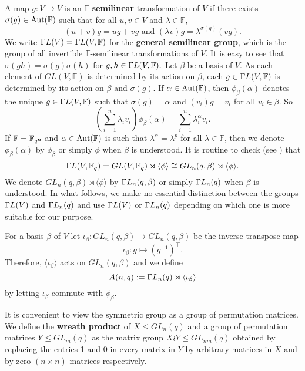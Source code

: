 A map $g: V \to V$ is an $\mathbb{F}$-{\bf semilinear}  transformation of $V$ if there exists $\sigma(g) \in \mathrm{Aut}(\mathbb{F})$ such that for all $u,v \in V$ and $\lambda \in \mathbb{F}$,
$$(u+v)g=ug +vg \text{ and } (\lambda v)g=\lambda^{\sigma(g)}(vg).$$
We write ${{\Gamma L}}(V)={{\Gamma L}}(V, \mathbb{F})$ for the {\bf general semilinear group}, which is the group of all invertible $\mathbb{F}$-semilinear transformations of $V$. It is easy to see that $\sigma(gh)=\sigma(g)\sigma(h)$ for $g,h \in {{\Gamma L}}(V, \mathbb{F}).$ Let $\beta$ be a basis of $V$. As each element of $GL(V, \mathbb{F})$ is determined by its action on $\beta$,  each  $g \in {{\Gamma L}}(V, \mathbb{F})$ is determined by its action on $\beta$ and $\sigma(g).$ If $\alpha \in \mathrm{Aut}(\mathbb{F})$, then $\phi_{\beta}(\alpha)$ denotes the unique  $g \in {{\Gamma L}}(V, \mathbb{F})$ such that $\sigma(g)=\alpha$ and $(v_i)g=v_i$ for all $v_i \in \beta.$ So
\begin{equation}
\label{defphibet}
\left(\sum_{i=1}^n \lambda_i v_i \right) \phi_{\beta}(\alpha)= \sum_{i=1}^n\lambda_i^{\alpha} v_i.
\end{equation}
 If $\mathbb{F}= \mathbb{F}_{q^{\bf u}}$ and $\alpha \in \mathrm{Aut}(\mathbb{F})$ is such that $\lambda^{\alpha}=\lambda^p$ for all $\lambda \in \mathbb{F}$,  then we denote $\phi_{\beta}(\alpha)$ by $\phi_{\beta}$ \index{$\phi_{\beta}$} or simply $\phi$ when $\beta$ is understood. It is routine to check (see \cite[\S 2.2]{kleidlieb}) that  $${{\Gamma L}}(V, \mathbb{F}_q)= GL(V, \mathbb{F}_q) \rtimes \langle \phi \rangle \cong GL_n(q, \beta) \rtimes \langle \phi \rangle.$$ We denote $GL_n(q, \beta) \rtimes \langle \phi \rangle$ by ${{\Gamma L}}_n(q, \beta)$ or simply ${{\Gamma L}}_n(q)$ when $\beta$ is understood. In what follows,
we make no essential distinction between the groups ${{\Gamma L}}(V )$ and ${{\Gamma L}}_n(q)$ and use ${{\Gamma L}}(V )$ or
${{\Gamma L}}_n (q)$ depending on which one is more suitable for our purpose.

For a basis $\beta$ of $V$ let $\iota_{\beta}: GL_n(q, \beta) \to GL_n(q, \beta)$ be the inverse-transpose map 
$$\iota_{\beta}: g \mapsto (g^{-1})^{\top}.$$ Therefore, $\langle \iota_{\beta} \rangle$ acts on $GL_n(q, \beta)$ and we define 
$$A(n,q):={{\Gamma L}}_n(q) \rtimes \langle \iota_{\beta} \rangle$$ by letting $\iota_{\beta}$  commute with $\phi_{\beta}.$

It is convenient to view  the symmetric group 
as a group of permutation matrices. We define the {\bf wreath product}   of  $X \le GL_n(q)$ and a  group of permutation matrices $Y \le GL_m(q)$ as the matrix group $X \wr Y \le GL_{nm}(q)$ obtained
by replacing the entries 1 and 0  in every matrix in $Y$ by
arbitrary matrices in $X$ and by zero $(n \times n)$ matrices respectively. 

